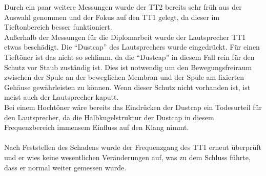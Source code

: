 \newpage
Durch ein paar weitere Messungen wurde der TT2 bereits sehr früh aus der Auswahl genommen und der Fokus auf den TT1 gelegt, da dieser im Tieftonbereich besser funktioniert.
\\
Außerhalb der Messungen für die Diplomarbeit wurde der Lautsprecher TT1 etwas beschädigt.
Die \enquote{Dustcap} des Lautsprechers wurde eingedrückt.
Für einen Tieftöner ist das nicht so schlimm, da die \enquote{Dustcap} in diesem Fall rein für den Schutz vor Staub zuständig ist.
Dies ist notwendig um den Bewegungsfreiraum zwischen der Spule an der beweglichen Membran und der Spule am fixierten Gehäuse gewährleisten zu können.
Wenn dieser Schutz nicht vorhanden ist, ist meist auch der Lautsprecher kaputt.\\
Bei einem Hochtöner wäre bereits das Eindrücken der Dustcap ein Todesurteil für den Lautsprecher, da die Halbkugelstruktur der Dustcap in diesem Frequenzbereich immensem Einfluss auf den Klang nimmt.
\\ \\
Nach Feststellen des Schadens wurde der Frequenzgang des TT1 erneut überprüft und er wies keine wesentlichen Veränderungen auf, was zu dem Schluss führte, dass er normal weiter gemessen wurde.
\\













